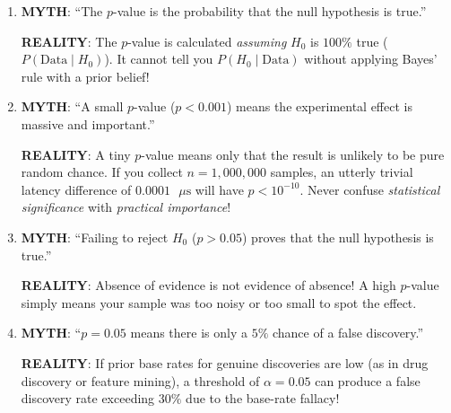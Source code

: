 \begin{warning}
\begin{enumerate}
    \item \textbf{MYTH}: ``The $p$-value is the probability that the null hypothesis is true.''
    
    \textbf{REALITY}: The $p$-value is calculated \textit{assuming} $H_0$ is $100\%$ true ($P(\text{Data} \mid H_0)$). It cannot tell you $P(H_0 \mid \text{Data})$ without applying Bayes' rule with a prior belief!
    \item \textbf{MYTH}: ``A small $p$-value ($p < 0.001$) means the experimental effect is massive and important.''
    
    \textbf{REALITY}: A tiny $p$-value means only that the result is unlikely to be pure random chance. If you collect $n = 1{,}000{,}000$ samples, an utterly trivial latency difference of $0.0001\text{ }\mu\text{s}$ will have $p < 10^{-10}$. Never confuse \textit{statistical significance} with \textit{practical importance}!
    \item \textbf{MYTH}: ``Failing to reject $H_0$ ($p > 0.05$) proves that the null hypothesis is true.''
    
    \textbf{REALITY}: Absence of evidence is not evidence of absence! A high $p$-value simply means your sample was too noisy or too small to spot the effect.
    \item \textbf{MYTH}: ``$p = 0.05$ means there is only a $5\%$ chance of a false discovery.''
    
    \textbf{REALITY}: If prior base rates for genuine discoveries are low (as in drug discovery or feature mining), a threshold of $\alpha = 0.05$ can produce a false discovery rate exceeding $30\%$ due to the base-rate fallacy!
\end{enumerate}
\end{warning}

